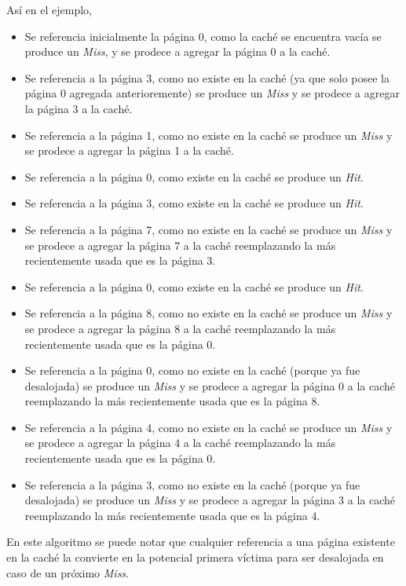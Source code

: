 \documentclass[11pt, a4paper, spanish]{article}
\begin{document}
As\'i en el ejemplo, 

\begin{itemize}
	\item{ Se referencia inicialmente la p\'agina 0, como la cach\'e se encuentra vac\'ia se produce un \textit{Miss}, y se prodece a agregar
		la p\'agina 0 a la cach\'e.}
	\item{ Se referencia a la p\'agina 3, como no existe en la cach\'e (ya que solo posee la p\'agina 0 agregada anterioremente) se produce 
		un \textit{Miss} y se prodece a agregar la p\'agina 3 a la cach\'e.}
	\item{ Se referencia a la p\'agina 1, como no existe en la cach\'e se produce un \textit{Miss} y se prodece a agregar la p\'agina 1 a la cach\'e.}
	\item{ Se referencia a la p\'agina 0, como existe en la cach\'e se produce un \textit{Hit}. }
	\item{ Se referencia a la p\'agina 3, como existe en la cach\'e se produce un \textit{Hit}. }
	\item{ Se referencia a la p\'agina 7, como no existe en la cach\'e se produce un \textit{Miss} y se prodece a agregar la p\'agina 7 a la cach\'e
		reemplazando la m\'as recientemente usada que es la p\'agina 3. }
	\item{ Se referencia a la p\'agina 0, como existe en la cach\'e se produce un \textit{Hit}. }
	\item{ Se referencia a la p\'agina 8, como no existe en la cach\'e se produce un \textit{Miss} y se prodece a agregar la p\'agina 8 a la cach\'e
		reemplazando la m\'as recientemente usada que es la p\'agina 0. }
	\item{ Se referencia a la p\'agina 0, como no existe en la cach\'e (porque ya fue desalojada) se produce un \textit{Miss} y se prodece a agregar 
		la p\'agina 0 a la cach\'e reemplazando la m\'as recientemente usada que es la p\'agina 8. }
	\item{ Se referencia a la p\'agina 4, como no existe en la cach\'e se produce un \textit{Miss} y se prodece a agregar 
		la p\'agina 4 a la cach\'e reemplazando la m\'as recientemente usada que es la p\'agina 0. }
	\item{ Se referencia a la p\'agina 3, como no existe en la cach\'e (porque ya fue desalojada) se produce un \textit{Miss} y se prodece a agregar 
		la p\'agina 3 a la cach\'e reemplazando la m\'as recientemente usada que es la p\'agina 4. }
\end{itemize}

En este algoritmo se puede notar que cualquier referencia a una p\'agina existente en la cach\'e la convierte en la potencial primera v\'ictima 
para ser desalojada en caso de un pr\'oximo \textit{Miss}.\\
\end{document}
